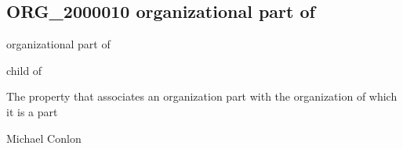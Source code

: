 \documentclass[letterpaper,10pt,english]{sphinxmanual}
\begin{document}
\subsection{ORG\_2000010 \sphinxhyphen{} organizational part of}
\label{\detokenize{doc-ORG_2000010:org-2000010-organizational-part-of}}\label{\detokenize{doc-ORG_2000010:index-0}}\label{\detokenize{doc-ORG_2000010::doc}}
\begin{sphinxShadowBox}

\sphinxAtStartPar
organizational part of
\end{sphinxShadowBox}

\begin{sphinxShadowBox}

\sphinxAtStartPar
child of
\end{sphinxShadowBox}

\begin{sphinxShadowBox}

\sphinxAtStartPar
{}
\end{sphinxShadowBox}

\begin{sphinxShadowBox}

\sphinxAtStartPar
The property that associates an organization part with the organization of which it is a part
\end{sphinxShadowBox}

\begin{sphinxShadowBox}

\sphinxAtStartPar
Michael Conlon 
\end{sphinxShadowBox}

\begin{sphinxShadowBox}

\sphinxAtStartPar
{\hyperref[\detokenize{doc-ORG_0000005::doc}]{}}
\end{sphinxShadowBox}

\begin{sphinxShadowBox}

\sphinxAtStartPar
{\hyperref[\detokenize{doc-ORG_0000001::doc}]{}}
\end{sphinxShadowBox}
\end{document}
